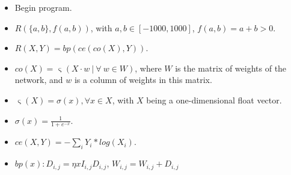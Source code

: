 \documentclass[10pt,a4paper,notitlepage]{article}
\begin{document}
	\begin{itemize}
		\item Begin program.
		\item $R(\{a, b\}, f(a, b))$, with $a, b \in [-1000, 1000]$, $f(a,b) = a + b > 0$.
		\item $R(X, Y) = bp(ce(co(X), Y))$.
		\item $co(X) = \upvarsigma(X \cdot w~|~\forall~w \in W)$, where $W$ is the matrix of weights of the network, and $w$ is a column of weights in this matrix.
		\item $\upvarsigma(X) = \sigma(x), \forall x \in X$, with $X$ being a one-dimensional float vector.
		\item $\sigma(x) = \frac{1}{1 + e^{-x}}$.
		\item $ce(X, Y) = -\sum_i Y_i * log(X_i)$.
		\item $bp(x): D_{i,j} = \eta x I_{i, j} D_{i, j}$, $W_{i,j} = W_{i,j} + D_{i, j}$
	\end{itemize}
\end{document}
